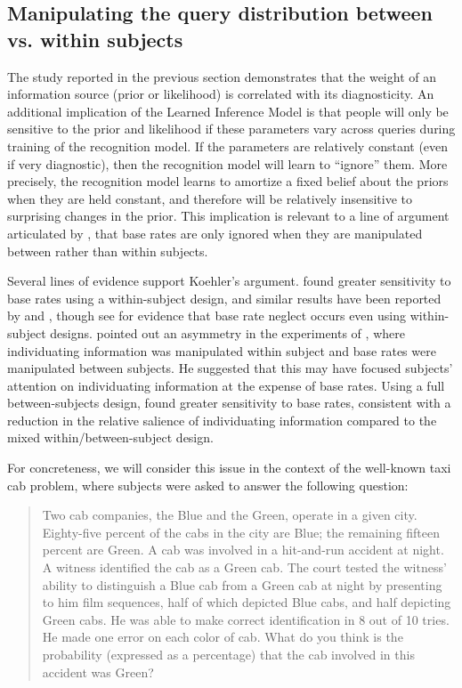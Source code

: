 \subsection{Manipulating the query distribution between vs. within subjects}

The study reported in the previous section demonstrates that the weight of an information source (prior or likelihood) is correlated with its diagnosticity. An additional implication of the Learned Inference Model is that people will only be sensitive to the prior and likelihood if these parameters vary across queries during training of the recognition model. If the parameters are relatively constant (even if very diagnostic), then the recognition model will learn to ``ignore'' them. More precisely, the recognition model learns to amortize a fixed belief about the priors when they are held constant, and therefore will be relatively insensitive to surprising changes in the prior. This implication is relevant to a line of argument articulated by \citet{koehler1996base}, that base rates are only ignored when they are manipulated between rather than within subjects.

Several lines of evidence support Koehler's argument. \citet{fischhoff1979subjective} found greater sensitivity to base rates using a within-subject design, and similar results have been reported by \citet{birnbaum1983bayesian} and \citet{schwarz1991ease}, though see \citet{dawes1993equating} for evidence that base rate neglect occurs even using within-subject designs. \citet{ajzen1977intuitive} pointed out an asymmetry in the experiments of \citet{kahneman1973psychology}, where individuating information was manipulated within subject and base rates were manipulated between subjects. He suggested that this may have focused subjects' attention on individuating information at the expense of base rates. Using a full between-subjects design, \citet{ajzen1977intuitive} found greater sensitivity to base rates, consistent with a reduction in the relative salience of individuating information compared to the mixed within/between-subject design.

For concreteness, we will consider this issue in the context of the well-known taxi cab problem, where subjects were asked to answer the following question:

\begin{quote}
{Two cab companies, the Blue and the Green, operate in a given city. Eighty-five percent of the cabs in the city are Blue; the remaining fifteen percent are Green. A cab was involved in a hit-and-run accident at night. A witness identified the cab as a Green cab.
The court tested the witness' ability to distinguish a Blue cab from a Green cab at night by presenting to him film sequences, half of which depicted Blue cabs, and half depicting Green cabs. He was able to make correct identification in 8 out of 10 tries. He made one error on each color of cab.
What do you think is the probability (expressed as a percentage) that the cab involved in this accident was Green?}
\end{quote} 

